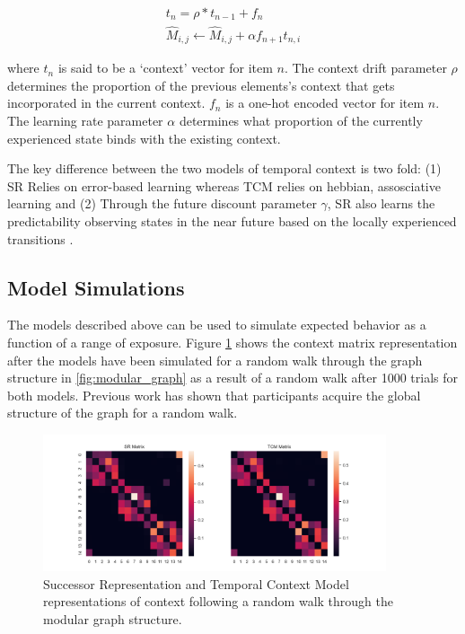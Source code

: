 \begin{equation}
	\begin{aligned}
		t_n = \rho * t_{n-1} + f_n \\ 
		\hat{M}_{i, j} \leftarrow \hat{M}_{i, j} + \alpha f_{n+1} t_{n, i}			
	\end{aligned}
\end{equation}

where $t_n$ is said to be a `context' vector for item $n$. The context drift parameter $\rho$ determines the proportion of the previous elements's context that gets incorporated in the current context. $f_n$ is a one-hot encoded vector for item $n$. The learning rate parameter $\alpha$ determines what proportion of the currently experienced state binds with the existing context. 

The key difference between the two models of temporal context is two fold: (1) SR Relies on error-based learning whereas TCM relies on hebbian, assosciative learning and (2) Through the future discount parameter $\gamma$, SR also learns the predictability observing states in the near future based on the locally experienced transitions \cite{gershman2012successor}.

\subsection{Model Simulations}
The models described above can be used to simulate expected behavior as a function of a range of exposure. Figure \ref{fig:SR-TCM-model-simulations} shows the context matrix representation after the models have been simulated for a random walk through the graph structure in \ref{fig:modular_graph} as a result of a random walk after 1000 trials for both models. Previous work has shown that participants acquire the global structure of the graph for a random walk. 

\begin{figure}[!ht]
	\centering
	\includegraphics[width = 0.9\textwidth]{chapter_notebooks/chapter_2/figures/SR_vs_TCM_Matrices.png}
	\caption{Successor Representation and Temporal Context Model representations of context following a random walk through the modular graph structure.}
	\label{fig:SR-TCM-model-simulations}
\end{figure}

